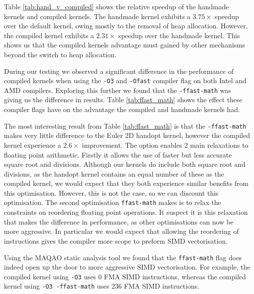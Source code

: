 Table \ref{tab:hand_v_compiled} shows the relative speedup of the handmade kernels and compiled kernels.
The handmade kernel exhibits a $3.75\times$ speedup over the default kernel, owing mostly to the removal of heap allocation.
However, the compiled kernel exhibits a $2.31\times$ speedup over the handmade kernel.
This shows us that the compiled kernels advantage must gained by other mechanisms beyond the switch to heap allocation.

During our testing we observed a significant difference in the performance of compiled kernels when using the \texttt{-O3} and \texttt{-Ofast} compiler flag on both Intel and AMD compilers.
Exploring this further we found that the \texttt{-ffast-math} was giving us the difference in results.
Table \ref{tab:ffast_math} shows the effect these compiler flags have on the advantage the compiled and handmade kernels had.

\begin{table}
    \centering
 
\caption{}\label{tab:ffast_math} 
\end{table}

The most interesting result from Table \ref{tab:ffast_math} is that the \texttt{-ffast-math} makes very little difference to the Euler 2D handopt kernel, however the compiled kernel experience a $2.6\times$ improvement.
The  option enables 2 main relaxations to floating point arithmetic.
Firstly it allows the use of faster but less accurate square root and divisions.
Although our kernels do include both square root and divisions, as the handopt kernel contains an equal number of these as the compiled kernel, we would expect that they both experience similar benefits from this optimisation.
However, this is not the case, so we can discount this optimisation.
The second optimisation \texttt{ffast-math} makes is to relax the constraints on reordering floating point operations.
It suspect it is this relaxation that makes the difference in performance, as other optimisations can now be more aggressive.
In particular we would expect that allowing the reordering of instructions gives the compiler more scope to preform SIMD vectorisation.

Using the MAQAO static analysis tool we found that the \texttt{ffast-math} flag does indeed open up the door to more aggressive SIMD vectorisation.
For example, the compiled kernel using \texttt{-O3} uses 0 FMA SIMD instructions, whereas the compiled kernel using \texttt{-O3 -ffast-math} uses 236 FMA SIMD instructions.

